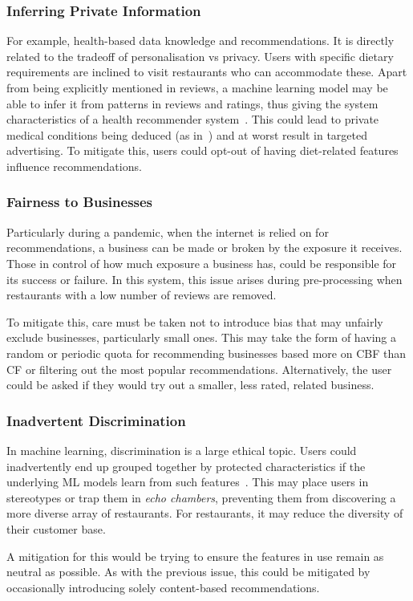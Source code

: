\subsubsection{Inferring Private Information}
For example, health-based data knowledge and recommendations.
It is directly related to the tradeoff of personalisation vs privacy.
Users with specific dietary requirements are inclined to visit restaurants who can accommodate these.
Apart from being explicitly mentioned in reviews, a machine learning model may be able to infer it from patterns in reviews and ratings, thus giving the system characteristics of a health recommender system~\cite{wiesner2014health}.
This could lead to private medical conditions being deduced (as in~\cite{gottlieb2013method, merchant2019evaluating}) and at worst result in targeted advertising.
To mitigate this, users could opt-out of having diet-related features influence recommendations.

\subsubsection{Fairness to Businesses}
Particularly during a pandemic, when the internet is relied on for recommendations, a business can be made or broken by the exposure it receives.
Those in control of how much exposure a business has, could be responsible for its success or failure.
In this system, this issue arises during pre-processing when restaurants with a low number of reviews are removed.

To mitigate this, care must be taken not to introduce bias that may unfairly exclude businesses, particularly small ones.
This may take the form of having a random or periodic quota for recommending businesses based more on CBF than CF or filtering out the most popular recommendations.
Alternatively, the user could be asked if they would try out a smaller, less rated, related business.

\subsubsection{Inadvertent Discrimination}
In machine learning, discrimination is a large ethical topic.
Users could inadvertently end up grouped together by protected characteristics if the underlying ML models learn from such features~\cite{abdollahi2018transparency}.
This may place users in stereotypes or trap them in \textit{echo chambers}, preventing them from discovering a more diverse array of restaurants.
For restaurants, it may reduce the diversity of their customer base.

A mitigation for this would be trying to ensure the features in use remain as neutral as possible.
As with the previous issue, this could be mitigated by occasionally introducing solely content-based recommendations.
